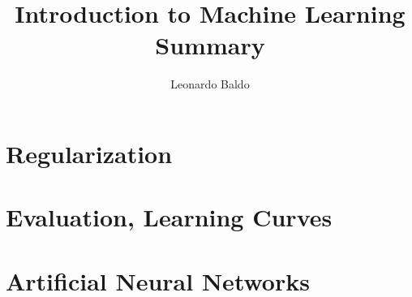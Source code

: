\documentclass{article}
\title{Introduction to Machine Learning Summary}
\author{Leonardo Baldo}
\date{}
\begin{document}
\maketitle
\newpage

\tableofcontents
\newpage








\section{Regularization}
\newpage

\section{Evaluation, Learning Curves}
\newpage

\section{Artificial Neural Networks}
\newpage
\end{document}
